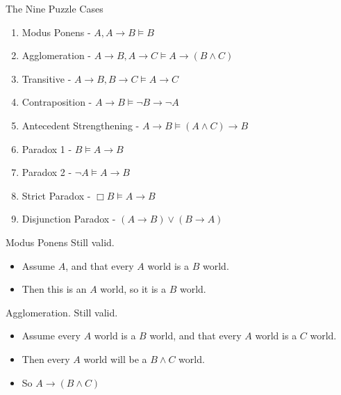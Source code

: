 \documentclass[
  ignorenonframetext,
]{beamer}
\providecommand{\tightlist}{%
  \setlength{\itemsep}{0pt}\setlength{\parskip}{0pt}}
\renewcommand{\,}{\text{, }}
\begin{document}
\begin{frame}{The Nine Puzzle Cases}
\protect\hypertarget{the-nine-puzzle-cases}{}
\begin{enumerate}
\tightlist
\item
  Modus Ponens - \(A, A \rightarrow B \vDash B\)
\item
  Agglomeration -
  \(A \rightarrow B, A \rightarrow C \vDash A \rightarrow (B \wedge C)\)
\item
  Transitive -
  \(A \rightarrow B, B \rightarrow C \vDash A \rightarrow C\)
\item
  Contraposition - \(A \rightarrow B \vDash \neg B \rightarrow \neg A\)
\item
  Antecedent Strengthening -
  \(A \rightarrow B \vDash (A \wedge C) \rightarrow B\)
\item
  Paradox 1 - \(B \vDash A \rightarrow B\)
\item
  Paradox 2 - \(\neg A \vDash A \rightarrow B\)
\item
  Strict Paradox - \(\Box B \vDash A \rightarrow B\)
\item
  Disjunction Paradox - \((A \rightarrow B) \vee (B \rightarrow A)\)
\end{enumerate}
\end{frame}

\begin{frame}{Modus Ponens}
\protect\hypertarget{modus-ponens}{}
Still valid.

\begin{itemize}
\tightlist
\item
  Assume \(A\), and that every \(A\) world is a \(B\) world.
\item
  Then this is an \(A\) world, so it is a \(B\) world.
\end{itemize}
\end{frame}

\begin{frame}{Agglomeration.}
\protect\hypertarget{agglomeration.}{}
Still valid.

\begin{itemize}
\tightlist
\item
  Assume every \(A\) world is a \(B\) world, and that every \(A\) world
  is a \(C\) world.
\item
  Then every \(A\) world will be a \(B \wedge C\) world.
\item
  So \(A \rightarrow (B \wedge C)\)
\end{itemize}
\end{frame}
\end{document}
